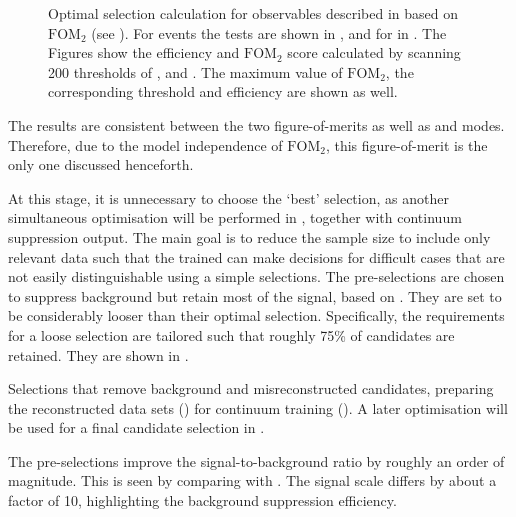 \begin{figure}[htbp!]
{        }
    \caption{\label{fig:selection_optimisations} Optimal selection calculation for observables
    described in  based on $\mathrm{FOM}_2$ (see ).
    For \BptoXsgamma events the tests are shown
    in ,
    and for \BztoXsgamma in .
    The Figures show the efficiency and $\mathrm{FOM}_2$ score calculated by scanning 200 thresholds of \piVeto, \etaVeto and \ZMVA.
    The maximum value of $\mathrm{FOM}_2$, the corresponding threshold and efficiency are shown as well.
    }
\end{figure}
The results are consistent between the two figure-of-merits as well as \Bp and \Bz modes.
Therefore, due to the model independence of $\mathrm{FOM}_2$, this figure-of-merit is the only one discussed henceforth.

At this stage, it is unnecessary to choose the `best' selection, 
as another simultaneous optimisation will be performed  in , together with continuum suppression \BDT output.
The main goal is to reduce the sample size to include only relevant data 
such that the trained \BDT can make decisions for difficult cases that are not easily distinguishable using a simple selections.
The pre-selections are chosen to suppress background but retain most of the signal, based on .
They are set to be considerably looser than their optimal selection.
Specifically, the requirements for a loose selection are tailored such that roughly 75\% of \BtoXsgamma candidates are retained.
They are shown in .

\begin{table}[htbp!]
    \centering
    \caption{\label{tab:preselections} Selections that remove background and misreconstructed candidates,
    preparing the reconstructed data sets () for continuum \BDT training ().
    A later optimisation will be used for a final candidate selection in .
    }
    
\end{table}

The pre-selections improve the signal-to-background ratio by roughly an order of magnitude.
This is seen by comparing  with .
The \BtoXsgamma signal \MC scale differs by about a factor of 10, highlighting the background suppression efficiency.

